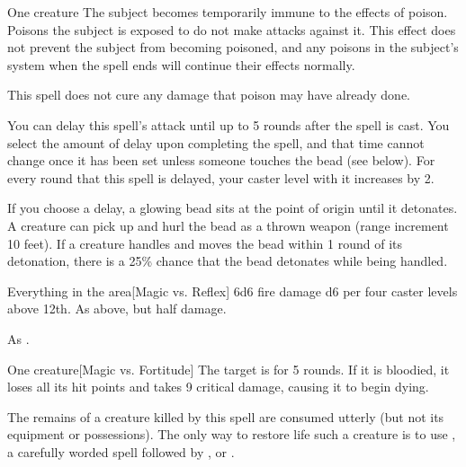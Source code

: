 \spellrng{\rngclose}
\spelldur{\durshort}
\begin{spelltarget}{One creature}
    \spelleffect The subject becomes temporarily immune to the effects of poison. Poisons the subject is exposed to do not make attacks against it. This effect does not prevent the subject from becoming poisoned, and any poisons in the subject's system when the spell ends will continue their effects normally. 
\end{spelltarget}
\spellnotes This spell does not cure any damage that poison may have already done.

\spellline
\spelleffect You can delay this spell's attack until up to 5 rounds after the spell is cast. You select the amount of delay upon completing the spell, and that time cannot change once it has been set unless someone touches the bead (see below). For every round that this spell is delayed, your caster level with it increases by 2.

If you choose a delay, a glowing bead sits at the point of origin until it detonates. A creature can pick up and hurl the bead as a thrown weapon (range increment 10 feet). If a creature handles and moves the bead within 1 round of its detonation, there is a 25\% chance that the bead detonates while being handled.
\begin{spelltargets}{Everything in the area}[Magic vs. Reflex]
    \spellsuccess 6d6 fire damage \add d6 per four caster levels above 12th.
    \spellfailure As above, but half damage.
\end{spelltargets}

\spellnotes As .

\spellrng{\rngclose}
\begin{spelltarget}{One creature}[Magic vs. Fortitude]
    \spellsuccess The target is \staggered for 5 rounds. If it is bloodied, it loses all its hit points and takes 9 critical damage, causing it to begin dying.
\end{spelltarget}
\spellnotes The remains of a creature killed by this spell are consumed utterly (but not its equipment or possessions). The only way to restore life such a creature is to use , a carefully worded  spell followed by , or .

